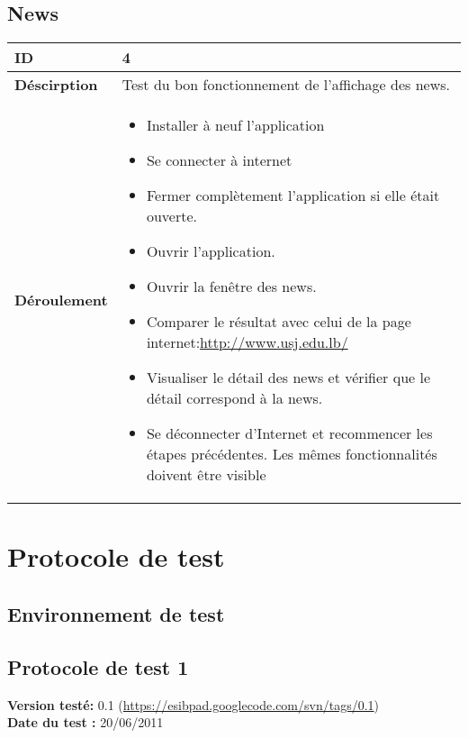 		\subsection{News}
					 \begin{longtable}{m{4cm}|p{10cm}|}
					 \textbf{ ID} & 4 \\
					 \hline \textbf{Déscirption} & Test du bon fonctionnement de l'affichage des news.\\
					 \hline \textbf{Déroulement} &
						 \begin{itemize}
						  	\item Installer à neuf l'application
						  	\item Se connecter à internet
							 \item Fermer complètement l'application si elle était ouverte.
							 \item Ouvrir l'application.
							 \item Ouvrir la fenêtre des news.
							 \item Comparer le résultat avec celui de la page internet:\url{http://www.usj.edu.lb/}
							 \item Visualiser le détail des news et vérifier que le détail correspond à la news.
							\item Se déconnecter d'Internet et recommencer les étapes précédentes. Les mêmes fonctionnalités doivent être visible
						 \end{itemize}
					 \\
				 \end{longtable} 
				 
				 
				 
\section{Protocole de test}
		\subsection{Environnement de test}
		\subsection{Protocole de test 1}
		\textbf{Version testé:} 0.1 (\url{https://esibpad.googlecode.com/svn/tags/0.1}) \\
		\textbf{	Date du test :} 20/06/2011

